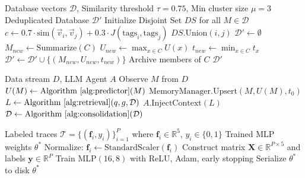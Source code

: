 \documentclass[conference]{IEEEtran}
\begin{document}
\begin{algorithm}[H]
\caption{Union-Find Consolidation}
\label{alg:consolidation}
\begin{algorithmic}[1]
\REQUIRE Database vectors $\mathcal{D}$, Similarity threshold $\tau = 0.75$, Min cluster size $\mu = 3$
\ENSURE Deduplicated Database $\mathcal{D}'$
\STATE Initialize Disjoint Set $DS$ for all $M \in \mathcal{D}$
    \STATE $c \leftarrow 0.7 \cdot \text{sim}(\vec{v}_i, \vec{v}_j) + 0.3 \cdot J(\text{tags}_i, \text{tags}_j)$
        \STATE $DS.\text{Union}(i, j)$
    \ENDIF
\ENDFOR
\STATE $\mathcal{D}' \leftarrow \emptyset$
    \STATE $M_{new} \leftarrow \text{Summarize}(C)$
    \STATE $U_{new} \leftarrow \max_{x \in C} U(x)$
    \STATE $t_{new} \leftarrow \min_{x \in C} t_x$
    \STATE $\mathcal{D}' \leftarrow \mathcal{D}' \cup \{(M_{new}, U_{new}, t_{new})\}$
    \STATE Archive members of $C$
\ENDFOR
\RETURN $\mathcal{D}'$
\end{algorithmic}
\end{algorithm}

\begin{algorithm}[H]
\caption{Complete FAMM Pipeline}
\label{alg:famm}
\begin{algorithmic}[1]
\REQUIRE Data stream $D$, LLM Agent $A$
    \STATE Observe $M$ from $D$
    \STATE $U(M) \leftarrow \text{Algorithm~\ref{alg:predictor}}(M)$
    \STATE $\text{MemoryManager.Upsert}(M, U(M), t_0)$
        \STATE $L \leftarrow \text{Algorithm~\ref{alg:retrieval}}(q, g, \mathcal{D})$
        \STATE $A.\text{InjectContext}(L)$
    \ENDIF
        \STATE $\mathcal{D} \leftarrow \text{Algorithm~\ref{alg:consolidation}}(\mathcal{D})$
    \ENDIF
\ENDWHILE
\end{algorithmic}
\end{algorithm}

\begin{algorithm}[H]
\caption{Retrospective Training (Learned Mode)}
\label{alg:training}
\begin{algorithmic}[1]
\REQUIRE Labeled traces $\mathcal{T} = \{(\mathbf{f}_i, y_i)\}_{i=1}^{P}$ where $\mathbf{f}_i \in \mathbb{R}^5$, $y_i \in \{0, 1\}$
\ENSURE Trained MLP weights $\theta^*$
    \STATE Normalize: $\mathbf{f}_i \leftarrow \text{StandardScaler}(\mathbf{f}_i)$
\ENDFOR
\STATE Construct matrix $\mathbf{X} \in \mathbb{R}^{P \times 5}$ and labels $\mathbf{y} \in \mathbb{R}^P$
\STATE Train MLP$(16, 8)$ with ReLU, Adam, early stopping
\STATE Serialize $\theta^*$ to disk
\RETURN $\theta^*$
\end{algorithmic}
\end{algorithm}
\end{document}
